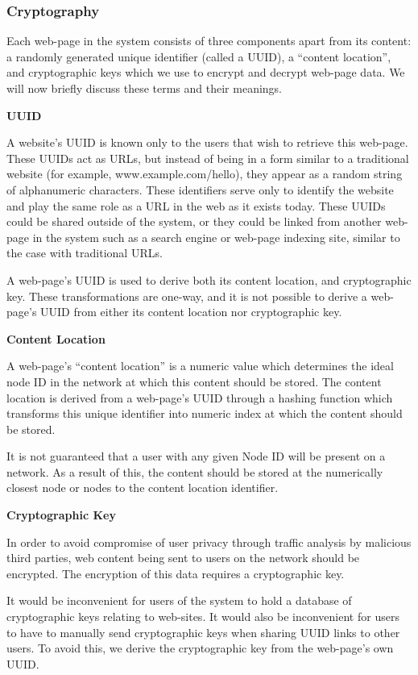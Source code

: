 \subsubsection{Cryptography}

Each web-page in the system consists of three components apart from its content: a randomly generated unique
identifier (called a UUID), a “content location”, and cryptographic keys which we use to encrypt and decrypt web-page data.
We will now briefly discuss these terms and their meanings.

\textbf{UUID}

A website's UUID is known only to the users that wish to retrieve this web-page. These UUIDs act as URLs, but instead of
being in a form similar to a traditional website (for example, www.example.com/hello), they appear as a random string of
alphanumeric characters. These identifiers serve only to identify the website and play the same role as a URL in the web as
it exists today. These UUIDs could be shared outside of the system, or they could be linked from another web-page in the system
such as a search engine or web-page indexing site, similar to the case with traditional URLs.

A web-page's UUID is used to derive both its content location, and cryptographic key. These transformations are one-way,
and it is not possible to derive a web-page's UUID from either its content location nor cryptographic key.

\textbf{Content Location}

A web-page's “content location” is a numeric value which determines the ideal node ID in the network at which this content
should be stored. The content location is derived from a web-page's UUID through a hashing function which transforms this unique
identifier into numeric index at which the content should be stored.

It is not guaranteed that a user with any given Node ID will be present on a network. As a result of this, the content should be
stored at the numerically closest node or nodes to the content location identifier.

\textbf{Cryptographic Key}

In order to avoid compromise of user privacy through traffic analysis by malicious third parties, web content being sent to users
on the network should be encrypted. The encryption of this data requires a cryptographic key.

It would be inconvenient for users of the system to hold a database of cryptographic keys relating to web-sites. It would also be
inconvenient for users to have to manually send cryptographic keys when sharing UUID links to other users. To avoid this, we derive
the cryptographic key from the web-page's own UUID.

